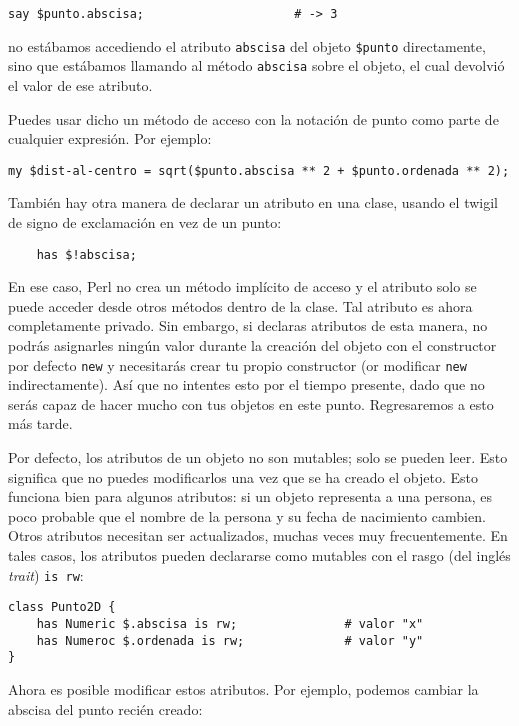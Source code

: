 \begin{verbatim}
say $punto.abscisa;                     # -> 3
\end{verbatim}
%
no estábamos accediendo el atributo {\tt abscisa} del objeto
\verb|$punto| directamente, sino que estábamos llamando al método
{\tt abscisa} sobre el objeto, el cual devolvió el valor de ese
atributo.


Puedes usar dicho un método de acceso con la notación de punto
como parte de cualquier expresión. Por ejemplo:

\begin{verbatim}
my $dist-al-centro = sqrt($punto.abscisa ** 2 + $punto.ordenada ** 2);
\end{verbatim}
%

También hay otra manera de declarar un atributo en una clase, 
usando el twigil de signo de exclamación en vez de un punto:

\begin{verbatim}
    has $!abscisa;  
\end{verbatim}
%
En ese caso, Perl no crea un método implícito de acceso 
y el atributo solo se puede acceder desde otros métodos
dentro de la clase. Tal atributo es ahora completamente privado. 
Sin embargo, si declaras atributos de esta manera, no podrás
asignarles ningún valor durante la creación del objeto con el 
constructor por defecto {\tt new} y necesitarás crear tu propio
constructor (or modificar {\tt new} indirectamente). Así que no
intentes esto por el tiempo presente, dado que no serás capaz
de hacer mucho con tus objetos en este punto. Regresaremos a esto 
más tarde.

Por defecto, los atributos de un objeto no son mutables; solo
se pueden leer. Esto significa que no puedes modificarlos una vez que 
se ha creado el objeto. Esto funciona bien para algunos atributos: si
un objeto representa a una persona, es poco probable que el nombre 
de la persona y su fecha de nacimiento cambien. Otros atributos necesitan
ser actualizados, muchas veces muy frecuentemente. En tales casos, los
atributos pueden declararse como mutables con el rasgo (del inglés \emph{trait})
 {\tt is rw}:

\begin{verbatim}
class Punto2D {
	has Numeric $.abscisa is rw;               # valor "x"
	has Numeroc $.ordenada is rw;              # valor "y" 
}
\end{verbatim}
%
Ahora es posible modificar estos atributos. Por ejemplo,
podemos cambiar la abscisa del punto recién creado:


